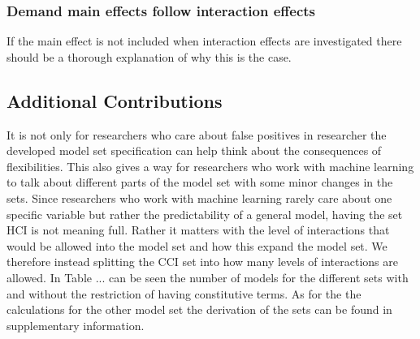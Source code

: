 \subsubsection{Demand main effects follow interaction effects}
If the main effect is not included when interaction effects are investigated there should be a thorough explanation of why this is the case.

\subsection{Additional Contributions}
It is not only for researchers who care about false positives in researcher the developed model set specification can help think about the consequences of flexibilities. This also gives a way for researchers who work with machine learning to talk about different parts of the model set with some minor changes in the sets. Since researchers who work with machine learning rarely care about one specific variable but rather the predictability of a general model, having the set HCI is not meaning full. Rather it matters with the level of interactions that would be allowed into the model set and how this expand the model set. We therefore instead splitting the CCI set into how many levels of interactions are allowed. In Table ... can be seen the number of models for the different sets with and without the restriction of having constitutive terms. As for the the calculations for the other model set the derivation of the sets can be found in supplementary information. 


 
